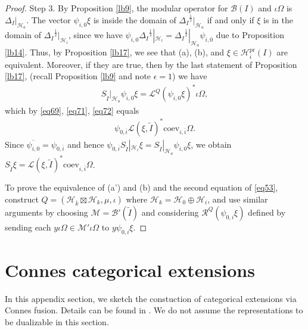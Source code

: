 \documentclass[12pt,a4paper]{article}
\theoremstyle{definition}
\theoremstyle{plain}
\newcommand{\mc}{\mathcal}
\newcommand{\wtd}{\widetilde}
\newcommand{\ovl}{\overline}
\newcommand{\coev}{\mathrm{coev}}
\newcommand{\scr}{\mathscr}
\newcommand{\pr}{\mathrm{pr}}
\numberwithin{equation}{section}
\begin{document}
\begin{proof}
Step 3. By Proposition \ref{lb9}, the modular operator for $\mc B(I)$ and $\iota\Omega$ is ${\Delta_I}|_{\mc H_a}$. The vector $\psi_{i,0}\xi$ is inside the domain of ${\Delta_I}^{\frac 12}|_{\mc H_a}$ if and only if $\xi$ is in the domain of ${\Delta_I}^{\frac 12}|_{\mc H_i}$, since we have $\psi_{i,0}{\Delta_I}^{\frac 12}|_{\mc H_i}={\Delta_I}^{\frac 12}|_{\mc H_a}\psi_{i,0}$ due to Proposition \ref{lb14}. Thus,  by Proposition \ref{lb17}, we see that (a), (b), and $\xi\in\mc H_i^\pr(I)$ are equivalent. Moreover, if they are true, then by the last statement of Proposition \ref{lb17}, (recall Proposition \ref{lb9} and note $\epsilon=1$) we have
\begin{align*}
S_{\wtd I}|_{\mc H_a}\psi_{i,0}\xi=\scr L^Q(\psi_{i,0}\xi)^*\iota\Omega,
\end{align*}
which by \eqref{eq69}, \eqref{eq71}, \eqref{eq72} equals
\begin{align*}
	\psi_{0,\ovl i}\scr L(\xi,\wtd I)^*\coev_{i,\ovl i}\Omega.
\end{align*}
Since $\ovl{\psi_{i,0}}=\psi_{0,\ovl i}$ and hence $\psi_{0,\ovl i} S_{\wtd I}|_{\mc H_i}\xi=S_{\wtd I}|_{\mc H_a}\psi_{i,0}\xi$, we obtain $S_{\wtd I}\xi=\scr L(\xi,\wtd I)^*\coev_{i,\ovl i}\Omega$.




To prove the equivalence of (a') and (b) and the second equation of \eqref{eq53}, construct $Q=(\mc H_{\ovl k}\boxtimes\mc H_k ,\mu,\iota)$ where $\mc H_k=\mc H_0\oplus\mc H_i$, and use similar arguments by choosing $\mc M=\mc B'(\wtd I)$ and considering $\scr R^Q(\psi_{0,i}\xi)$ defined by sending each $y\iota\Omega\in\mc M'\iota\Omega$ to $y\psi_{0,i}\xi$.
\end{proof}










\appendix




\section{Connes categorical extensions}\label{lb23}

In this appendix section, we sketch the constuction of categorical extensions via Connes fusion. Details can be found in \cite{Gui21a}. We do not assume the representations to be dualizable in this section.
\end{document}
